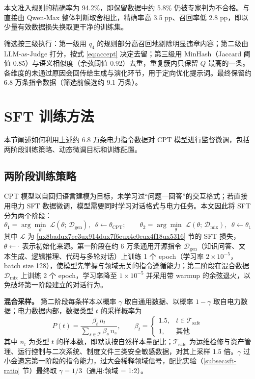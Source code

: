 \documentclass[fontset=fandol,type=master,campus=shenzhen,etitleauto=true]{hithesisbook}
\begin{document}
本文准入规则的精确率为 94.2\%，即保留数据中约 5.8\% 仍被专家判为不合格。与直接由 Qwen-Max 整体判断取舍相比，精确率高 3.5 pp、召回率低 2.8 pp，即以少量有效数据损失换取更干净的训练集。

筛选按三级执行：第一级用 $q_4$ 的规则部分高召回地剔除明显违章内容；第二级由 LLM-as-Judge\cite{ref65} 打分，按式 \eqref{eq:accept} 决定去留；第三级用 MinHash（Jaccard 阈值 0.85）与语义相似度（余弦阈值 0.92）去重，重复簇内只保留 $Q$ 最高的一条。各维度的未通过原因会回传给生成与演化环节，用于定向优化提示词。最终保留约 6.8 万条指令数据（筛选前候选约 9.1 万条）。

\section{SFT 训练方法}\label{sec:sft-train}

本节阐述如何利用上述约 6.8 万条电力指令数据对 CPT 模型进行监督微调，包括两阶段训练策略、动态微调目标和训练配置。

\subsection{两阶段训练策略}\label{ux4e24ux9636ux6bb5-sft-ux7b56ux7565}

CPT 模型以自回归语言建模为目标，未学习过“问题—回答”的交互格式；若直接用电力 SFT 数据微调，模型需要同时学习对话格式与电力任务。本文因此将 SFT 分为两个阶段：
\begin{equation}\label{eq:sft-stage}
\theta_1 = \arg\min_{\theta} \; \mathcal{L}(\theta;\, \mathcal{D}_{\text{gen}}), \;\; \theta \leftarrow \theta_{\text{CPT}}; \qquad
\theta_2 = \arg\min_{\theta} \; \mathcal{L}(\theta;\, \mathcal{D}_{\text{mix}}), \;\; \theta \leftarrow \theta_1
\end{equation}
其中 $\mathcal{L}$ 为 \ref{ux8badux7ec3ux914dux7f6eux4e0eux4f18ux5316} 节的 SFT 损失，$\theta \leftarrow \cdot$ 表示初始化来源。第一阶段在约 6 万条通用开源指令 $\mathcal{D}_{\text{gen}}$（知识问答、文本生成、逻辑推理、代码与多轮对话）上训练 1 个 epoch（学习率 $2 \times 10^{-5}$，batch size 128），使模型先掌握与领域无关的指令遵循能力；第二阶段在混合数据 $\mathcal{D}_{\text{mix}}$ 上训练 2 个 epoch，学习率降至 $1 \times 10^{-5}$ 并采用带 warmup 的余弦退火，以免破坏第一阶段建立的对话行为。

\textbf{混合采样。} 第二阶段每条样本以概率 $\gamma$ 取自通用数据、以概率 $1 - \gamma$ 取自电力数据；电力数据内部，数据类型 $t$ 的采样概率为
\begin{equation}\label{eq:sft-sampling}
P(t) = \frac{\beta_t\, n_t}{\sum_{s \in \mathcal{T}} \beta_s\, n_s}, \qquad
\beta_t = \begin{cases} 1.5, & t \in \mathcal{T}_{\text{safe}} \\ 1, & \text{其他} \end{cases}
\end{equation}
其中 $n_t$ 为类型 $t$ 的样本数，即默认按自然样本量配比；$\mathcal{T}_{\text{safe}}$ 为运维检修与资产管理、运行控制与二次系统、制度文件三类安全敏感数据，对其上采样 1.5 倍。$\gamma$ 过小会遗忘第一阶段的指令能力，过大会稀释领域信号，配比实验（\ref{subsec:sft-ratio} 节）最终取 $\gamma = 1/3$（通用:领域 = 1:2）。
\end{document}
